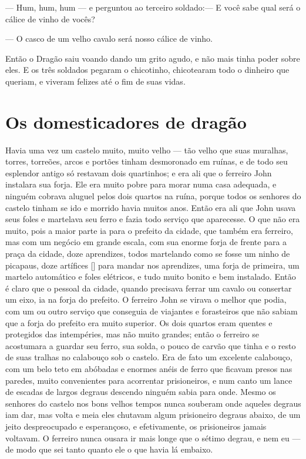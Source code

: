 — Hum, hum, hum — e perguntou ao terceiro soldado:— E você sabe qual
será o cálice de vinho de vocês?

— O casco de um velho cavalo será nosso cálice de vinho.

Então o Dragão saiu voando dando um grito agudo, e não mais tinha
poder sobre eles. E os três soldados pegaram o chicotinho,
chicotearam todo o dinheiro que queriam, e viveram felizes até o fim
de suas vidas.

\chapter{Os domesticadores de dragão}

Havia uma vez um castelo muito, muito velho — tão velho que suas
muralhas, torres, torreões, arcos e portões tinham desmoronado em
ruínas, e de todo seu esplendor antigo só restavam dois quartinhos; e
era ali que o ferreiro John instalara sua forja. Ele era muito pobre
para morar numa casa adequada, e ninguém cobrava aluguel pelos dois
quartos na ruína, porque todos os senhores do castelo tinham se ido e
morrido havia muitos anos. Então era ali que John usava seus foles e
martelava seu ferro e fazia todo serviço que aparecesse. O que não
era muito, pois a maior parte ia para o prefeito da cidade, que
também era ferreiro, mas com um negócio em grande escala, com sua
enorme forja de frente para a praça da cidade, doze aprendizes, todos
martelando como se fosse um ninho de picapaus, doze artífices [] para
mandar nos aprendizes, uma forja de primeira, um martelo automático e
foles elétricos, e tudo muito bonito e bem instalado. Então é claro
que o pessoal da cidade, quando precisava ferrar um cavalo ou
consertar um eixo, ia na forja do prefeito. O ferreiro John se virava
o melhor que podia, com um ou outro serviço que conseguia de
viajantes e forasteiros que não sabiam que a forja do prefeito era
muito superior. Os dois quartos eram quentes e protegidos das
intempéries, mas não muito grandes; então o ferreiro se acostumara a
guardar seu ferro, sua solda, o pouco de carvão que tinha e o resto
de suas tralhas no calabouço sob o castelo. Era de fato um excelente
calabouço, com um belo teto em abóbadas e enormes anéis de ferro que
ficavam presos nas paredes, muito convenientes para acorrentar
prisioneiros, e num canto um lance de escadas de largos degraus
descendo ninguém sabia para onde. Mesmo os senhores do castelo nos
bons velhos tempos nunca souberam onde aqueles degraus iam dar, mas
volta e meia eles chutavam algum prisioneiro degraus abaixo, de um
jeito despreocupado e esperançoso, e efetivamente, os prisioneiros
jamais voltavam. O ferreiro nunca ousara ir mais longe que o sétimo
degrau, e nem eu — de modo que sei tanto quanto ele o que havia lá
embaixo.

